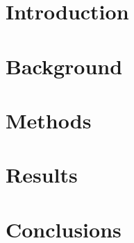 \documentclass[twoside,twocolumn]{article}
\begin{document}
\maketitle
\section{Introduction}\label{ch:intro}

\section{Background}\label{ch:backgr}

\section{Methods}\label{ch:methods}

\section{Results}\label{ch:res}

\section{Conclusions}\label{ch:conclusion}

\printbibliography
\end{document}
